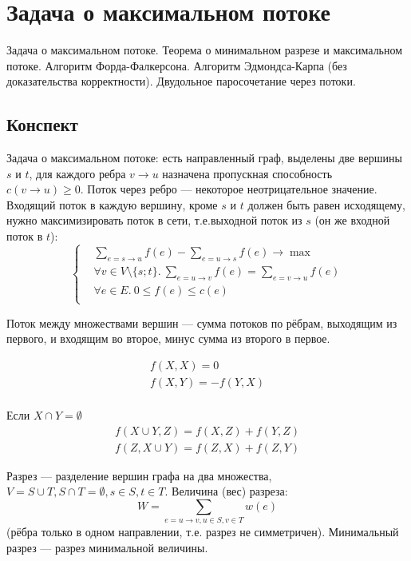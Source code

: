 \section{Задача о максимальном потоке}
Задача о максимальном потоке.
Теорема о минимальном разрезе и максимальном потоке.
Алгоритм Форда-Фалкерсона.
Алгоритм Эдмондса-Карпа (без доказательства корректности).
Двудольное паросочетание через потоки.

\subsection{Конспект}
Задача о максимальном потоке:
есть направленный граф, выделены две вершины $s$ и $t$,
для каждого ребра $v \to u$
назначена пропускная способность $c(v \to u) \ge 0$.
Поток через ребро --- некоторое неотрицательное значение.
Входящий поток в каждую вершину, кроме $s$ и $t$
должен быть равен исходящему,
нужно максимизировать поток в сети,
т.е.выходной поток из $s$ (он же входной поток в $t$):
\[
    \left\{
    \begin{aligned}
        & \sum_{e = s \to u} f(e) - \sum_{e = u \to s} f(e) \to \max \\
        & \forall v \in V \setminus \{s; t\}.~\sum_{e = u \to v} f(e) = \sum_{e = v \to u} f(e) \\
        & \forall e \in E.~0 \le f(e) \le c(e) \\
    \end{aligned}
    \right.
\]

Поток между множествами вершин
--- сумма потоков по рёбрам,
выходящим из первого, и входящим во второе,
минус сумма из второго в первое.

\begin{theorem}
    \begin{gather*}
        f(X, X) = 0 \\
        f(X, Y) = -f(Y, X) \\
    \end{gather*}

    Если $X \cap Y = \emptyset$
    \begin{gather*}
        f(X \cup Y, Z) = f(X, Z) + f(Y, Z) \\
        f(Z, X \cup Y) = f(Z, X) + f(Z, Y)
    \end{gather*}
\end{theorem}

Разрез --- разделение вершин графа на два множества,
$V = S \cup T, S \cap T = \emptyset, s \in S, t \in T$.
Величина (вес) разреза:
\[ W = \sum_{e = u \to v, u \in S, v \in T} w(e) \]
(рёбра только в одном направлении,
т.е. разрез не симметричен).
Минимальный разрез --- разрез минимальной величины.


